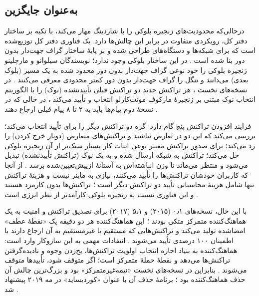 \documentclass[12pt,a4paper]{article}
\begin{document}
\subsection{ به‌عنوان جایگزین}

درحالی‌که  محدودیت‌های زنجیره بلوکی را با شاردینگ مهار می‌کند،  با تکیه بر ساختار دفتر کل، رویکردی متفاوت در برابر این چالش‌ها دارد.  یک فناوری دفتر کل توزیع‌شده است که برای شبکه‌ها و دستگاه‌های  طراحی شده و بر پایهٔ ساختار گراف جهت‌دار بدون دور بنا شده است \cite{sealeyIOTATangle202022, IOTATANGLE20, silvanoIotaTangleCryptocurrency2020}. در این ساختار بلوکی وجود ندارد؛ نویسندگان سیلوانو و مارچلینو زنجیره بلوکی را خود نوعی گراف جهت‌دار بدون دور محدود شده به یک مسیر (بلوک بعدی) می‌دانند و تنگل را گراف جهت‌دار بدون دور کمتر محدودی معرفی می‌کنند \cite{silvanoIotaTangleCryptocurrency2020}. در نسخه‌های نخست ، هر تراکنش جدید دو تراکنش قبلی تأییدنشده (نوک) را با الگوریتم انتخاب نوک مبتنی بر زنجیرهٔ مارکوف مونت‌کارلو انتخاب و تأیید می‌کند \cite{silvanoIotaTangleCryptocurrency2020}، در حالی که در نسخهٔ دوم پیام‌ها باید به ۲ تا ۸ پیام قبلی ارجاع دهند \cite{IOTATANGLE20, sealeyIOTATangle202022}.

فرایند افزودن تراکنش پنج گام دارد: گره دو تراکنش دیگر را برای تأیید انتخاب می‌کند؛ بررسی می‌کند که این دو در تعارض نباشند و تراکنش‌های متعارض (دوبار خرج کردن) را رد می‌کند؛ برای صدور تراکنش معتبر نوعی اثبات کار بسیار سبک‌تر از آن زنجیره بلوکی حل می‌کند؛ تراکنش به شبکه ارسال شده و به یک نوک (تراکنش تأییدنشده) تبدیل می‌شود و منتظر می‌ماند تا وزن انباشته‌اش به آستانهٔ از‌پیش‌تعیین‌شده برسد \cite{silvanoIotaTangleCryptocurrency2020}. از آنجا که کاربران خودشان تراکنش‌ها را تأیید می‌کنند، نیازی به ماینر نیست و هزینهٔ تراکنش تنها شامل هزینهٔ محاسباتی تأیید دو تراکنش دیگر است \cite{silvanoIotaTangleCryptocurrency2020}؛ تراکنش‌ها بدون کارمزد هستند \cite{silvanoIotaTangleCryptocurrency2020, IOTATANGLE20} و این فناوری نسبت به زنجیره بلوکی کارآمدتر از نظر انرژی است \cite{silvanoIotaTangleCryptocurrency2020, sealeyIOTATangle202022, IOTATANGLE20}.

با این حال، نسخه‌های ۰٫۱ (۲۰۱۵) و ۵٫۱ (۲۰۱۷)  برای تصدیق تراکنش و امنیت به یک هماهنگ‌کننده متمرکز متکی بودند \cite{IOTATANGLE20}؛ این هماهنگ‌کننده هر دو دقیقه یک «نقطهٔ عطف» امضاشده تولید می‌کند و تراکنش‌هایی که مستقیم یا غیرمستقیم به آن ارجاع دارند با اطمینان ۱۰۰ درصدی تأیید می‌شوند \cite{silvanoIotaTangleCryptocurrency2020}. انتقادات مهمی به این سازوکار وارد است: هماهنگ‌کننده به بنیاد  اجازه انتخاب اولویت تراکنش‌ها، یخ‌زدن وجوه و نادیده‌گرفتن تراکنش‌ها می‌دهد و نقطهٔ حملهٔ متمرکز است؛ اگر متوقف شود، تأیید‌ها متوقف می‌شوند \cite{silvanoIotaTangleCryptocurrency2020}. بنابراین  در نسخه‌های نخست «نیمه‌غیرمتمرکز» بود و بزرگ‌ترین چالش آن حذف هماهنگ‌کننده بود \cite{silvanoIotaTangleCryptocurrency2020}؛ برنامهٔ حذف آن با عنوان «کوردیساید» در مه ۲۰۱۹ پیشنهاد شد \cite{silvanoIotaTangleCryptocurrency2020}.
\end{document}
